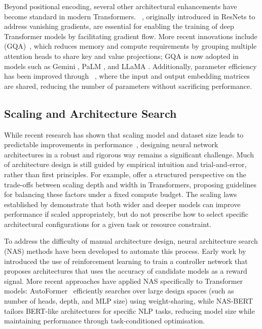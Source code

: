 Beyond positional encoding, several other architectural enhancements have become standard in modern Transformers. ~\citep{he2016deep}, originally introduced in ResNets to address vanishing gradients, are essential for enabling the training of deep Transformer models by facilitating gradient flow. More recent innovations include  (GQA)~\citep{ainslie2023gqa}, which reduces memory and compute requirements by grouping multiple attention heads to share key and value projections; GQA is now adopted in models such as Gemini \citep{deepmind2023gemini}, PaLM \citep{chowdhery2023palm}, and LLaMA \citep{touvron2023llama}. Additionally, parameter efficiency has been improved through ~\citep{press2017using}, where the input and output embedding matrices are shared, reducing the number of parameters without sacrificing performance.

\subsection{Scaling and Architecture Search}
While recent research has shown that scaling model and dataset size leads to predictable improvements in performance~\citep{kaplan2020scaling, henighan2020scaling}, designing neural network architectures in a robust and rigorous way remains a significant challenge. Much of architecture design is still guided by empirical intuition and trial-and-error, rather than first principles. For example, \citet{levine2020depth} offer a structured perspective on the trade-offs between scaling depth and width in Transformers, proposing guidelines for balancing these factors under a fixed compute budget. The scaling laws established by \citet{kaplan2020scaling} demonstrate that both wider and deeper models can improve performance if scaled appropriately, but do not prescribe how to select specific architectural configurations for a given task or resource constraint.

To address the difficulty of manual architecture design, neural architecture search (NAS) methods have been developed to automate this process. Early work by \citet{zoph2017neural} introduced the use of reinforcement learning to train a controller network that proposes architectures that uses the accuracy of candidate models as a reward signal. More recent approaches have applied NAS specifically to Transformer models: AutoFormer~\citep{chen2021autoformer} efficiently searches over large design spaces (such as number of heads, depth, and MLP size) using weight-sharing, while NAS-BERT~\citep{xu2021nasbert} tailors BERT-like architectures for specific NLP tasks, reducing model size while maintaining performance through task-conditioned optimisation.

